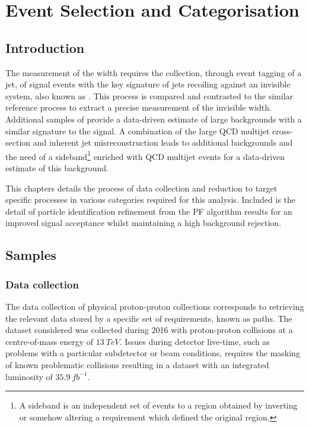 \chapter{Event Selection and Categorisation}
\label{chap:analysis}


\section{Introduction}

The measurement of the \IZinv width requires the collection, through event tagging of a jet, of \IZvvj signal events with the key signature of jets recoiling against an invisible system, also known as \metplusjets. This process is compared and contrasted to the similar \IDYllj reference process to extract a precise measurement of the invisible width. Additional samples of \IWlvj provide a data-driven estimate of large backgrounds with a similar signature to the signal. A combination of the large QCD multijet cross-section and inherent jet misreconstruction leads to additional backgrounds and the need of a sideband\footnote{A sideband is an independent set of events to a region obtained by inverting or somehow altering a requirement which defined the original region.} enriched with QCD multijet events for a data-driven estimate of this background.

This chapters details the process of data collection and reduction to target specific processes in various categories required for this analysis. Included is the detail of particle identification refinement from the PF algorithm results for an improved signal acceptance whilst maintaining a high background rejection.

\section{Samples}

\subsection{Data collection}

The data collection of physical proton-proton collections corresponds to retrieving the relevant data stored by a specific set of \SWT requirements, known as \SWT paths. The dataset considered was collected during 2016 with proton-proton collisions at a centre-of-mass energy of ${\SI{13}{TeV}}$.  Issues during detector live-time, such as problems with a particular subdetector or beam conditions, requires the masking of known problematic collisions resulting in a dataset with an integrated luminosity of ${\SI{35.9}{fb^{-1}}}$.

